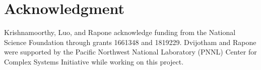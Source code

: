 \section*{Acknowledgment}

Krishnamoorthy, Luo, and Rapone acknowledge funding from the National Science Foundation through grants 1661348 and 1819229.
Dvijotham and Rapone were supported by the Pacific Northwest National Laboratory (PNNL) Center for Complex Systems Initiative while working on this project. 
